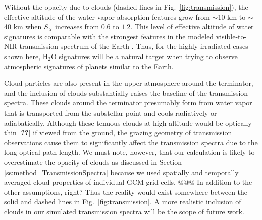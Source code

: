 \documentclass[11pt,numberedappendix,twocolappendix,]{emulateapj}
\def\water{H$_2$O }
\def\memo#1{\color{red}$[${\bf #1}$]$ \color{black}}
\newcommand{\dsa}[1]{{\color{blue}#1}}
\begin{document}
Without the opacity due to clouds (dashed lines in Fig.~\ref{fig:transmission}), the effective altitude of the water vapor absorption features grow from $\sim $10 km to $\sim $40 km when $S_X$ increases from $0.6$ to $1.2$. 
This level of effective altitude of water signatures is comparable with the strongest features in the modeled visible-to-NIR transmission spectrum of the Earth \citep[e.g.,][]{Kaltenegger2009}.
\dsa{Thus}, for the highly-irradiated \dsa{cases} shown here, \water signatures \dsa{will be a natural target} when trying to \dsa{observe atmospheric} signatures of planets similar to the Earth. 

\dsa{Cloud particles} are also present in the upper atmosphere around the terminator, and \dsa{the} inclusion of \dsa{clouds substantially} raises the \dsa{baseline} of the transmission spectra. 
%
These clouds around the terminator presumably form from water vapor that is transported from the substellar point and cools radiatively or adiabatically. 
%
%
Although these tenuous clouds at high altitude would be optically thin \memo{??} if viewed from the ground, the grazing geometry of \dsa{transmission observations cause them to significantly} affect the transmission spectra due to \dsa{the long} optical path length. 
We must note, however, that our calculation is likely to overestimate the opacity of clouds as discussed in Section \ref{ss:method_TransmissionSpectra} because we used spatially and temporally averaged cloud properties of individual GCM grid cells. \dsa{@@@ In addition to the other assumptions, right?}
Thus the reality would exist somewhere between the solid and dashed lines \dsa{in Fig.~\ref{fig:transmission}}.
A more realistic \dsa{inclusion of clouds in our simulated transmission spectra} will be the scope of future work. 
\end{document}

